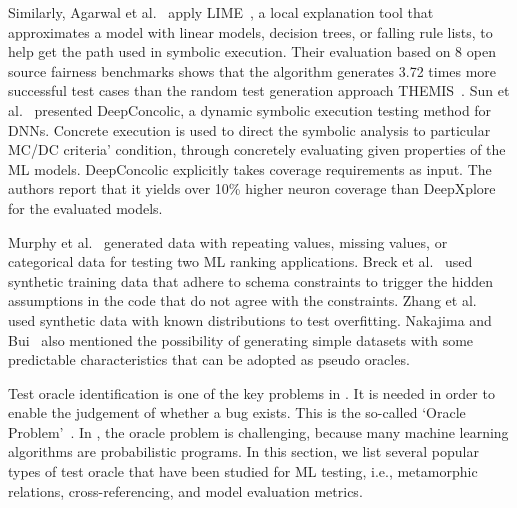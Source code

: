 Similarly, Agarwal et al.~ apply LIME~, a local explanation tool that approximates a model with linear models, decision trees, or falling rule lists, to help get the path used in symbolic execution.
Their evaluation based on 8 open source fairness benchmarks shows that the algorithm generates 3.72 times more successful test cases than the random test generation approach THEMIS~.
Sun et al.~ presented DeepConcolic, 
a dynamic symbolic execution testing method for DNNs.
Concrete execution is used to direct the symbolic analysis to particular MC/DC criteria' condition, through concretely evaluating given properties of the ML models. 
DeepConcolic explicitly takes coverage requirements as input.
The authors report that it yields over 10\% higher neuron coverage than DeepXplore for the evaluated models.

Murphy et al.~ generated data with repeating values, missing values, or categorical data for testing two ML ranking applications.
Breck et al.~ used synthetic training data that adhere to schema constraints to trigger the hidden assumptions in the code that do not agree with the constraints.
Zhang et al.~ used synthetic data with known distributions to test overfitting.
Nakajima and Bui~ also mentioned the possibility of generating simple datasets with some predictable characteristics that can be adopted as pseudo oracles.

\label{sec:oracle}
Test oracle identification is one of the key problems in \mlt{}.
It is needed in order to enable the judgement of whether a bug exists.
This is the so-called `Oracle Problem'~. 
In \mlt{}, the oracle problem is challenging, because many machine learning algorithms are probabilistic programs. 
In this section, we list several popular types of test oracle that have been studied for ML testing, i.e., metamorphic relations, cross-referencing, and model evaluation metrics.


